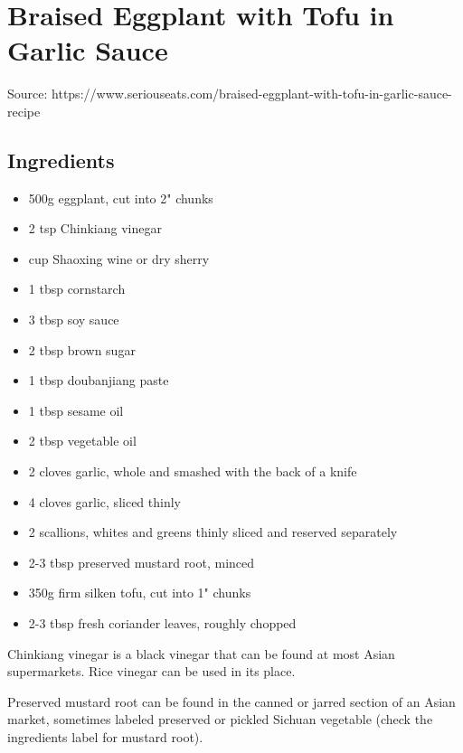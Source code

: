\section{Braised Eggplant with Tofu in Garlic Sauce}


Source: https://www.seriouseats.com/braised-eggplant-with-tofu-in-garlic-sauce-recipe

\subsection{Ingredients}

\begin{itemize}
    \item 500g eggplant, cut into 2" chunks
    \item 2 tsp Chinkiang vinegar
    \item {} cup Shaoxing wine or dry sherry
    \item 1 tbsp cornstarch
    \item 3 tbsp soy sauce
    \item 2 tbsp brown sugar
    \item 1 tbsp doubanjiang paste
    \item 1 tbsp sesame oil
    \item 2 tbsp vegetable oil
    \item 2 cloves garlic, whole and smashed with the back of a knife
    \item 4 cloves garlic, sliced thinly
    \item 2 scallions, whites and greens thinly sliced and reserved separately
    \item 2-3 tbsp preserved mustard root, minced
    \item 350g firm silken tofu, cut into 1" chunks
    \item 2-3 tbsp fresh coriander leaves, roughly chopped
\end{itemize}

Chinkiang vinegar is a black vinegar that can be found at most Asian supermarkets. Rice vinegar can be used in its place.

Preserved mustard root can be found in the canned or jarred section of an Asian market, sometimes labeled preserved or pickled Sichuan vegetable (check the ingredients label for mustard root).

